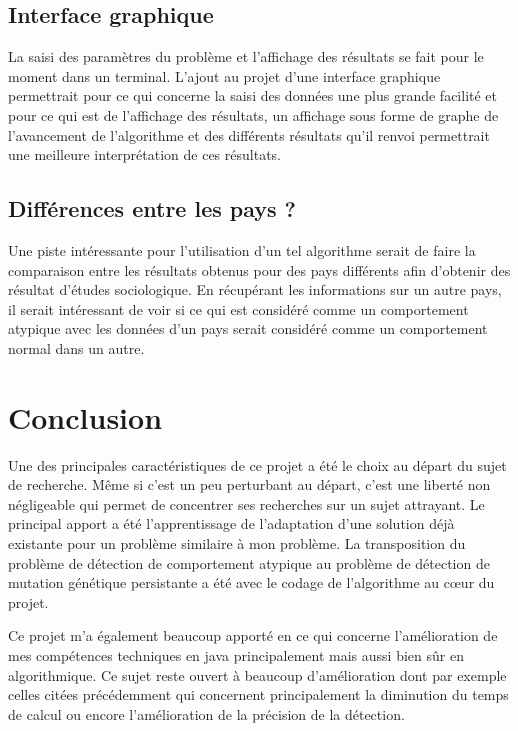 \documentclass[a4paper, 11pt]{article}
\begin{document}
\subsection{Interface graphique}

La saisi des paramètres du problème et l'affichage des résultats se fait pour le moment dans un terminal. L'ajout au projet d'une interface graphique permettrait pour ce qui concerne la saisi des données une plus grande facilité et pour ce qui est de l'affichage des résultats, un affichage sous forme de graphe de l'avancement de l'algorithme et des différents résultats qu'il renvoi permettrait une meilleure interprétation de ces résultats.


\subsection{Différences entre les pays ?}

Une piste intéressante pour l'utilisation d'un tel algorithme serait de faire la comparaison entre les résultats obtenus pour des pays différents afin d'obtenir des résultat d'études sociologique. En récupérant les informations sur un autre pays, il serait intéressant de voir si ce qui est considéré comme un comportement atypique avec les données d'un pays serait considéré comme un comportement normal dans un autre.

\newpage
\section*{{\LARGE Conclusion}}
\vspace{1cm}


Une des principales caractéristiques de ce projet a été le choix au départ du sujet de recherche. Même si c'est un peu perturbant au départ, c'est une liberté non négligeable qui permet de concentrer ses recherches sur un sujet attrayant. Le principal apport a été l'apprentissage de l'adaptation d'une solution déjà existante pour un problème similaire à mon problème. La transposition du problème de détection de comportement atypique au problème de détection de mutation génétique persistante a été avec le codage de l'algorithme au c\oe ur du projet.

Ce projet m'a également beaucoup apporté en ce qui concerne l'amélioration de mes compétences techniques en java principalement mais aussi bien sûr en algorithmique. Ce sujet reste ouvert à beaucoup d'amélioration dont par exemple celles citées précédemment qui concernent principalement la diminution du temps de calcul ou encore l'amélioration de la précision de la détection.
\end{document}
